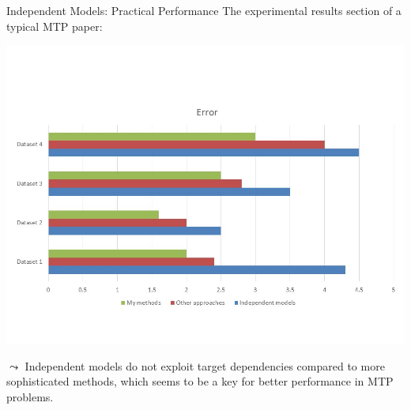 \documentclass[11pt,compress,t,notes=noshow, xcolor=table]{beamer}
\begin{document}
\begin{frame}{Independent Models: Practical Performance}
%	
	The experimental results section of a typical MTP paper: 
%	
	\begin{center}
		\includegraphics[scale=0.45, trim = 0 50 0 100,clip]{figure/barplots} \\
	\end{center}
%
	$\leadsto$ Independent models do not exploit target dependencies compared to more sophisticated methods, which seems to be a key for better performance in MTP problems.
%	
\end{frame}
\end{document}
